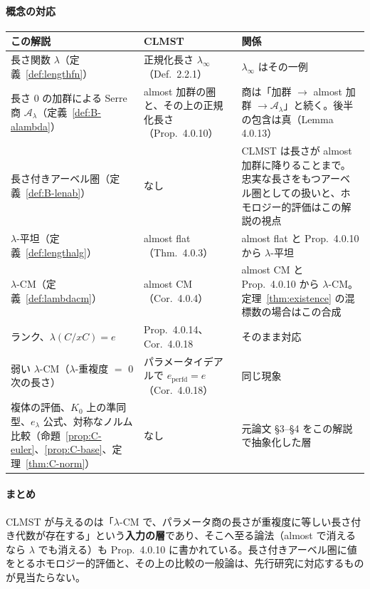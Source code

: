 \documentclass[11pt,a4paper]{ltjsarticle}
\numberwithin{equation}{section}
\theoremstyle{plain}
\theoremstyle{definition}
\theoremstyle{definition}
\begin{document}
\paragraph{概念の対応}
\begin{center}
\small
\begin{tabularx}{\textwidth}{>{\raggedright}p{3.6cm}>{\raggedright}X>{\raggedright\arraybackslash}X}
\toprule
この解説 & CLMST & 関係 \\
\midrule
長さ関数 $\lambda$（定義~\ref{def:lengthfn}） & 正規化長さ $\lambda_\infty$（Def.~2.2.1） & $\lambda_\infty$ はその一例 \\
長さ $0$ の加群による Serre 商 $\mathcal{A}_\lambda$（定義~\ref{def:B-alambda}） & almost 加群の圏と、その上の正規化長さ（Prop.~4.0.10） & 商は「加群 $\to$ almost 加群 $\to\mathcal{A}_\lambda$」と続く。後半の包含は真（Lemma 4.0.13） \\
長さ付きアーベル圏（定義~\ref{def:B-lenab}） & なし & CLMST は長さが almost 加群に降りることまで。忠実な長さをもつアーベル圏としての扱いと、ホモロジー的評価はこの解説の視点 \\
$\lambda$-平坦（定義~\ref{def:lengthalg}） & almost flat（Thm.~4.0.3） & almost flat と Prop.~4.0.10 から $\lambda$-平坦 \\
$\lambda$-CM（定義~\ref{def:lambdacm}） & almost CM（Cor.~4.0.4） & almost CM と Prop.~4.0.10 から $\lambda$-CM。定理~\ref{thm:existence} の混標数の場合はこの合成 \\
ランク、$\lambda(C/xC) = e$ & Prop.~4.0.14、Cor.~4.0.18 & そのまま対応 \\
弱い $\lambda$-CM（$\lambda$-重複度 $=$ $0$ 次の長さ） & パラメータイデアルで $e_{\mathrm{perfd}} = e$（Cor.~4.0.18） & 同じ現象 \\
複体の評価、$K_0$ 上の準同型、$e_\lambda$ 公式、対称なノルム比較（命題~\ref{prop:C-euler}、\ref{prop:C-base}、定理~\ref{thm:C-norm}） & なし & 元論文 §3--§4 をこの解説で抽象化した層 \\
\bottomrule
\end{tabularx}
\end{center}

\paragraph{まとめ}
CLMST が与えるのは「$\lambda$-CM で、パラメータ商の長さが重複度に等しい長さ付き代数が存在する」という\textbf{入力の層}であり、そこへ至る論法（almost で消えるなら $\lambda$ でも消える）も Prop.~4.0.10 に書かれている。長さ付きアーベル圏に値をとるホモロジー的評価と、その上の比較の一般論は、先行研究に対応するものが見当たらない。
\end{document}

